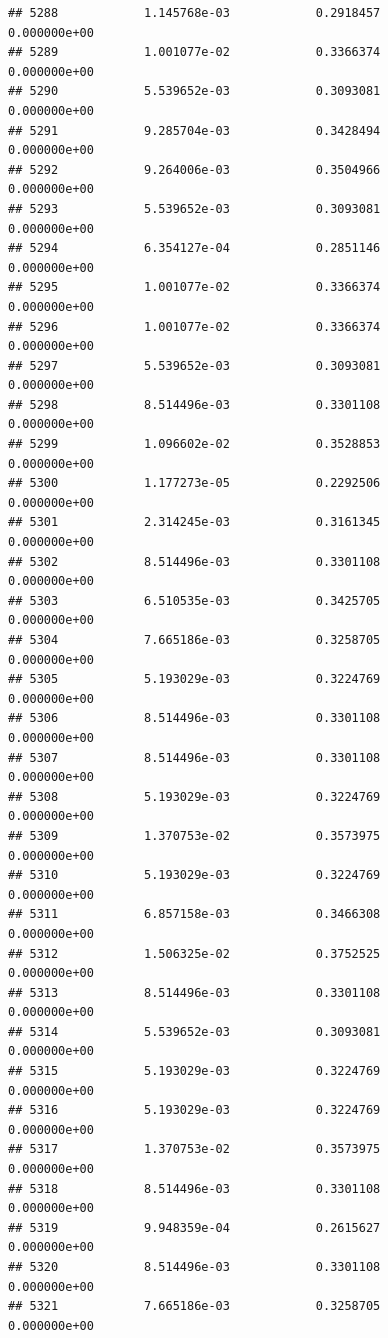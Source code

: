 \documentclass[
]{article}
\begin{document}
\begin{verbatim}
## 5288            1.145768e-03            0.2918457            0.000000e+00
## 5289            1.001077e-02            0.3366374            0.000000e+00
## 5290            5.539652e-03            0.3093081            0.000000e+00
## 5291            9.285704e-03            0.3428494            0.000000e+00
## 5292            9.264006e-03            0.3504966            0.000000e+00
## 5293            5.539652e-03            0.3093081            0.000000e+00
## 5294            6.354127e-04            0.2851146            0.000000e+00
## 5295            1.001077e-02            0.3366374            0.000000e+00
## 5296            1.001077e-02            0.3366374            0.000000e+00
## 5297            5.539652e-03            0.3093081            0.000000e+00
## 5298            8.514496e-03            0.3301108            0.000000e+00
## 5299            1.096602e-02            0.3528853            0.000000e+00
## 5300            1.177273e-05            0.2292506            0.000000e+00
## 5301            2.314245e-03            0.3161345            0.000000e+00
## 5302            8.514496e-03            0.3301108            0.000000e+00
## 5303            6.510535e-03            0.3425705            0.000000e+00
## 5304            7.665186e-03            0.3258705            0.000000e+00
## 5305            5.193029e-03            0.3224769            0.000000e+00
## 5306            8.514496e-03            0.3301108            0.000000e+00
## 5307            8.514496e-03            0.3301108            0.000000e+00
## 5308            5.193029e-03            0.3224769            0.000000e+00
## 5309            1.370753e-02            0.3573975            0.000000e+00
## 5310            5.193029e-03            0.3224769            0.000000e+00
## 5311            6.857158e-03            0.3466308            0.000000e+00
## 5312            1.506325e-02            0.3752525            0.000000e+00
## 5313            8.514496e-03            0.3301108            0.000000e+00
## 5314            5.539652e-03            0.3093081            0.000000e+00
## 5315            5.193029e-03            0.3224769            0.000000e+00
## 5316            5.193029e-03            0.3224769            0.000000e+00
## 5317            1.370753e-02            0.3573975            0.000000e+00
## 5318            8.514496e-03            0.3301108            0.000000e+00
## 5319            9.948359e-04            0.2615627            0.000000e+00
## 5320            8.514496e-03            0.3301108            0.000000e+00
## 5321            7.665186e-03            0.3258705            0.000000e+00

\end{verbatim}
\end{document}
